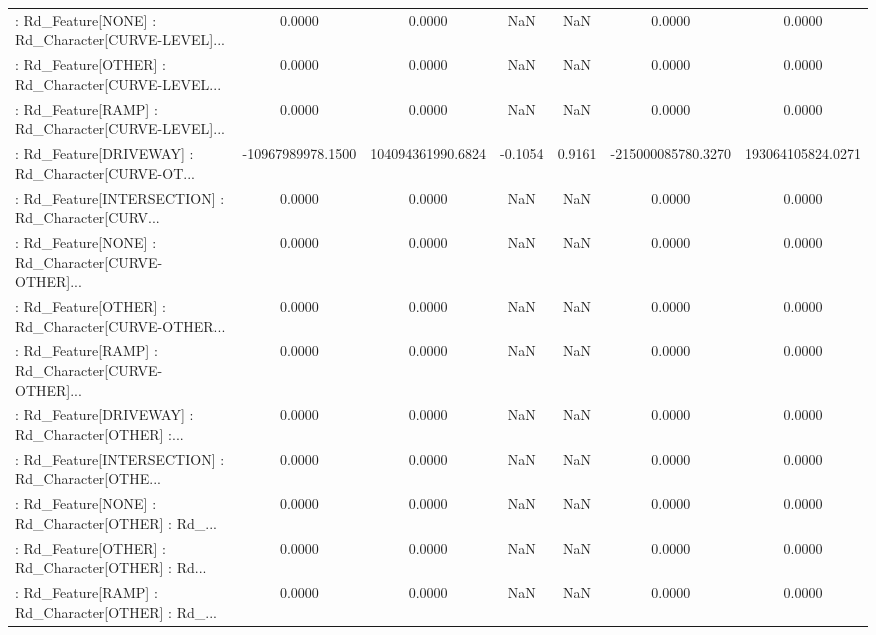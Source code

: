 \begin{longtable}{p{4cm}cccccc}
 : Rd\_Feature[NONE] : Rd\_Character[CURVE-LEVEL]... &            0.0000 &            0.0000 &     NaN &          NaN &             0.0000 &            0.0000 \\
 : Rd\_Feature[OTHER] : Rd\_Character[CURVE-LEVEL... &            0.0000 &            0.0000 &     NaN &          NaN &             0.0000 &            0.0000 \\
 : Rd\_Feature[RAMP] : Rd\_Character[CURVE-LEVEL]... &            0.0000 &            0.0000 &     NaN &          NaN &             0.0000 &            0.0000 \\
 : Rd\_Feature[DRIVEWAY] : Rd\_Character[CURVE-OT... & -10967989978.1500 & 104094361990.6824 & -0.1054 &       0.9161 & -215000085780.3270 & 193064105824.0271 \\
 : Rd\_Feature[INTERSECTION] : Rd\_Character[CURV... &            0.0000 &            0.0000 &     NaN &          NaN &             0.0000 &            0.0000 \\
 : Rd\_Feature[NONE] : Rd\_Character[CURVE-OTHER]... &            0.0000 &            0.0000 &     NaN &          NaN &             0.0000 &            0.0000 \\
 : Rd\_Feature[OTHER] : Rd\_Character[CURVE-OTHER... &            0.0000 &            0.0000 &     NaN &          NaN &             0.0000 &            0.0000 \\
 : Rd\_Feature[RAMP] : Rd\_Character[CURVE-OTHER]... &            0.0000 &            0.0000 &     NaN &          NaN &             0.0000 &            0.0000 \\
 : Rd\_Feature[DRIVEWAY] : Rd\_Character[OTHER] :... &            0.0000 &            0.0000 &     NaN &          NaN &             0.0000 &            0.0000 \\
 : Rd\_Feature[INTERSECTION] : Rd\_Character[OTHE... &            0.0000 &            0.0000 &     NaN &          NaN &             0.0000 &            0.0000 \\
 : Rd\_Feature[NONE] : Rd\_Character[OTHER] : Rd\_... &            0.0000 &            0.0000 &     NaN &          NaN &             0.0000 &            0.0000 \\
 : Rd\_Feature[OTHER] : Rd\_Character[OTHER] : Rd... &            0.0000 &            0.0000 &     NaN &          NaN &             0.0000 &            0.0000 \\
 : Rd\_Feature[RAMP] : Rd\_Character[OTHER] : Rd\_... &            0.0000 &            0.0000 &     NaN &          NaN &             0.0000 &            0.0000 \\

\end{longtable}
